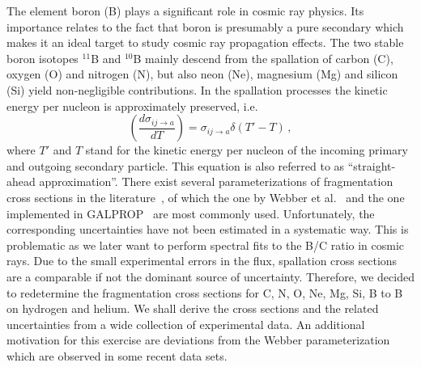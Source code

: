 \documentclass[a4paper,11pt]{article}
\begin{document}
The element boron (B) plays a significant role in cosmic ray physics. Its importance relates to the fact that boron is presumably a pure secondary which makes it an ideal target to study cosmic ray propagation effects. The two stable boron isotopes $^{11}$B and $^{10}$B mainly descend from the spallation of carbon (C), oxygen (O) and nitrogen (N), but also neon (Ne), magnesium (Mg) and silicon (Si) yield non-negligible contributions. In the spallation processes the kinetic energy per nucleon is approximately preserved, i.e.
\begin{equation}
 \left(\frac{d\sigma_{ij\rightarrow a}}{dT}\right) = \sigma_{ij\rightarrow a} \delta(T'-T)\,,
\end{equation}
where $T'$ and $T$ stand for the kinetic energy per nucleon of the incoming primary and outgoing secondary particle. This equation is also referred to as ``straight-ahead approximation''. There exist several parameterizations of fragmentation cross sections in the literature~\cite{Silberberg:1973jxa,Silberberg:1998lxa,Webber:2003,Moskalenko:2003kp}, of which the one by Webber et al.~\cite{Webber:2003} and the one implemented in GALPROP~\cite{Moskalenko:2003kp} are most commonly used. Unfortunately, the corresponding uncertainties have not been estimated in a systematic way. This is problematic as we later want to perform spectral fits to the B/C ratio in cosmic rays. Due to the small experimental errors in the flux, spallation cross sections are a comparable if not the dominant source of uncertainty. Therefore, we decided to redetermine the fragmentation cross sections for C, N, O, Ne, Mg, Si, B to B on hydrogen and helium. We shall derive the cross sections and the related uncertainties from a wide collection of experimental data. An additional motivation for this exercise are deviations from the Webber parameterization which are observed in some recent data sets.
\end{document}
